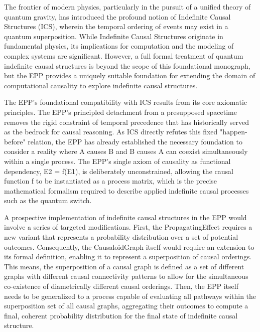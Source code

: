 The frontier of modern physics, particularly in the pursuit of a unified theory of quantum gravity, has introduced the profound notion of Indefinite Causal Structures (ICS), wherein the temporal ordering of events may exist in a quantum superposition. While Indefinite Causal Structures originate in fundamental physics, its implications for computation and the modeling of complex systems are significant.  However, a full formal treatment of quantum indefinite causal structures is beyond the scope of this foundational monograph, but the EPP provides a uniquely suitable foundation for extending the domain of computational causality to explore indefinite causal structures.

The EPP’s foundational compatibility with ICS results from its core axiomatic principles. The EPP's principled detachment from a presupposed spacetime removes the rigid constraint of temporal precedence that has historically served as the bedrock for causal reasoning. As ICS directly refutes this fixed "happen-before" relation, the EPP has already established the necessary foundation to consider a reality where A causes B and B causes A can coexist simultaneously within a single process. The EPP’s single axiom of causality as functional dependency, E2 = f(E1), is deliberately unconstrained, allowing the causal function f to be instantiated as a process matrix, which is the precise mathematical formalism required to describe applied indefinite causal processes such as the quantum switch.

A prospective implementation of indefinite causal structures in the EPP would involve a series of targeted modifications. First, the PropagatingEffect requires a new variant that represents a probability distribution over a set of potential outcomes. Consequently, the CausaloidGraph itself would require an extension to its formal definition, enabling it to represent a superposition of causal orderings. This means, the superposition of a causal graph is defined as a set of different graphs with different causal connectivity patterns to allow for the simultaneous co-existence of diametrically different causal orderings. Then, the EPP itself needs to be generalized to a process capable of evaluating all pathways within the superposition set of all causal graphs, aggregating their outcomes to compute a final, coherent probability distribution for the final state of indefinite causal structure.

